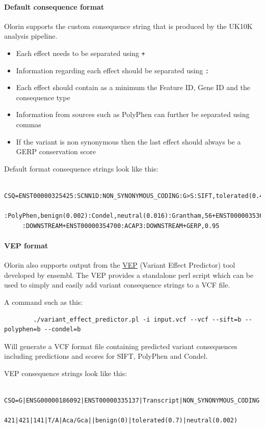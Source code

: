 \documentclass{article}
\begin{document}
	\paragraph{Default consequence format}
	Olorin supports the custom consequence string that is produced by the UK10K analysis pipeline.
	 \begin{itemize}
		\item{Each effect needs to be separated using \texttt{+}}
		\item{Information regarding each effect should be separated using \texttt{:}}		
		\item{Each effect should contain as a minimum the Feature ID, Gene ID and the consequence type}
		\item{Information from sources such as PolyPhen can further be separated using commas}
		\item{If the variant is non synonymous then the last effect should always be a GERP conservation score}
	 \end{itemize}
	 
	 Default format consequence strings look like this:
	\begin{verbatim}
	 CSQ=ENST00000325425:SCNN1D:NON_SYNONYMOUS_CODING:G>S:SIFT,tolerated(0.4)
	 :PolyPhen,benign(0.002):Condel,neutral(0.016):Grantham,56+ENST00000353662:ACAP3
	 :DOWNSTREAM+ENST00000354700:ACAP3:DOWNSTREAM+GERP,0.95
	\end{verbatim}
	
	\paragraph{VEP format}
	Olorin also supports output from the \href{http://www.ensembl.org/info/docs/variation/vep/index.html}{VEP} (Variant Effect Predictor) tool developed by ensembl. The VEP provides a standalone perl script which can be used to simply and easily add variant consequence strings to a VCF file.

	A command such as this:
	\begin{verbatim}
		./variant_effect_predictor.pl -i input.vcf --vcf --sift=b --polyphen=b --condel=b	
	\end{verbatim}
	Will generate a VCF format file containing predicted variant consequences including predictions and scores for SIFT, PolyPhen and Condel.

	VEP consequence strings look like this:
	\begin{verbatim}
		CSQ=G|ENSG00000186092|ENST00000335137|Transcript|NON_SYNONYMOUS_CODING|
		421|421|141|T/A|Aca/Gca||benign(0)|tolerated(0.7)|neutral(0.002)
	\end{verbatim}
	
\end{document}

